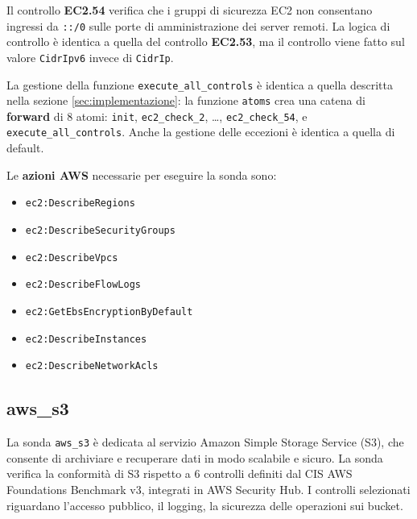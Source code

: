 Il controllo \textbf{EC2.54} verifica che i gruppi di sicurezza EC2 non consentano ingressi da \texttt{::/0} sulle porte di amministrazione dei server remoti. La logica di controllo è identica a quella del controllo \textbf{EC2.53}, ma il controllo viene fatto sul valore \texttt{CidrIpv6} invece di \texttt{CidrIp}. 

La gestione della funzione \texttt{execute\_all\_controls} è identica a quella descritta nella sezione \ref{sec:implementazione}: la funzione \texttt{atoms} crea una catena di \textbf{forward} di 8 atomi: \texttt{init}, \texttt{ec2\_check\_2}, \dots, \texttt{ec2\_check\_54}, e \texttt{execute\_all\_controls}. Anche la gestione delle eccezioni è identica a quella di default.

Le \textbf{azioni AWS} necessarie per eseguire la sonda sono:

\begin{itemize}
    \item \texttt{ec2:DescribeRegions}
    \item \texttt{ec2:DescribeSecurityGroups}
    \item \texttt{ec2:DescribeVpcs}
    \item \texttt{ec2:DescribeFlowLogs}
    \item \texttt{ec2:GetEbsEncryptionByDefault}
    \item \texttt{ec2:DescribeInstances}
    \item \texttt{ec2:DescribeNetworkAcls}
\end{itemize}

\subsection{aws\_s3}
\label{sec:s3}

La sonda \texttt{aws\_s3} è dedicata al servizio Amazon Simple Storage Service (S3), che consente di archiviare e recuperare dati in modo scalabile e sicuro. La sonda verifica la conformità di S3 rispetto a 6 controlli definiti dal CIS AWS Foundations Benchmark v3, integrati in AWS Security Hub. I controlli selezionati riguardano l'accesso pubblico, il logging, la sicurezza delle operazioni sui bucket.

